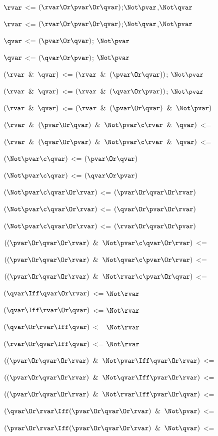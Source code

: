 $\rvar$ <= $(\rvar \Or \pvar \Or\qvar)$;$\Not \pvar$,$\Not \qvar$

$\rvar$ <= $(\rvar \Or \pvar \Or\qvar)$;$\Not \qvar$,$\Not \pvar$

$\qvar$ <= $( \pvar \Or \qvar)$; $\Not \pvar$

$\qvar$ <= $( \qvar \Or \pvar)$; $\Not \pvar$

$(\rvar \And \qvar)$ <= $(\rvar \And ( \pvar \Or \qvar))$; $\Not \pvar$

$(\rvar \And \qvar)$ <= $(\rvar \And ( \qvar \Or \pvar))$; $\Not \pvar$

$(\rvar \And \qvar)$ <= $(\rvar \And ( \pvar \Or \qvar) \And \Not\pvar )$

$(\rvar \And ( \pvar \Or \qvar) \And \Not\pvar  \c \rvar \And \qvar)$ <=

$(\rvar \And ( \qvar \Or \pvar) \And \Not\pvar  \c \rvar \And \qvar)$ <=

$(\Not \pvar \c \qvar)$ <= $(\pvar \Or \qvar)$

$(\Not \pvar \c \qvar)$ <= $(\qvar \Or \pvar)$

$(\Not \pvar \c \qvar \Or \rvar)$ <= $(\pvar\Or\qvar\Or\rvar)$

$(\Not \pvar \c \qvar \Or \rvar)$ <= $(\qvar\Or\pvar\Or\rvar)$

$(\Not \pvar \c \qvar \Or \rvar)$ <= $(\rvar\Or\qvar\Or\pvar)$

$((\pvar \Or \qvar \Or \rvar) \And \Not \pvar \c \qvar \Or \rvar)$ <=

$((\pvar \Or \qvar \Or \rvar) \And \Not \qvar \c \pvar \Or \rvar)$ <=

$((\pvar \Or \qvar \Or \rvar) \And \Not \rvar \c \pvar \Or \qvar)$ <=

$(\qvar \Iff \qvar \Or \rvar)$ <= $\Not\rvar$

$(\qvar \Iff \rvar \Or \qvar)$ <= $\Not\rvar$

$(\qvar \Or \rvar\Iff \qvar)$ <= $\Not\rvar$

$(\rvar \Or \qvar\Iff \qvar)$ <= $\Not\rvar$

$((\pvar \Or \qvar \Or \rvar) \And \Not \pvar \Iff \qvar \Or \rvar)$ <= 

$((\pvar \Or \qvar \Or \rvar) \And \Not \qvar \Iff \pvar \Or \rvar)$ <= 

$((\pvar \Or \qvar \Or \rvar) \And \Not \rvar \Iff \pvar \Or \qvar)$ <= 

$(\qvar \Or \rvar \Iff (\pvar \Or \qvar \Or \rvar) \And \Not \pvar)$ <= 

$(\pvar \Or \rvar \Iff (\pvar \Or \qvar \Or \rvar) \And \Not \qvar)$ <= 


